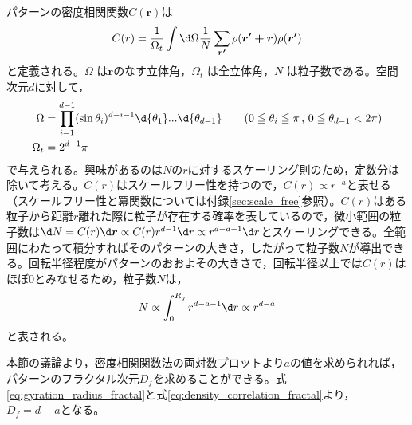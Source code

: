 \documentclass[autodetect-engine,dvi=dvipdfmx,a4paper,ja=standard,oneside,openany,11pt]{bxjsbook}
\begin{document}
パターンの密度相関関数$C(\bm{r})$は
\begin{equation}
  C(r)=\frac{1}{\Omega_t}\int \d\Omega \frac{1}{N}\sum_{{\bm{r'}}}\rho(\bm{r'+ r})\rho({\bm{r'}})
  \label{eq:density_correlation}
\end{equation}
と定義される。$\Omega$ は$\bm{r}$のなす立体角，$\Omega_t$ は全立体角，$N$ は粒子数である。空間次元$d$に対して，
\begin{equation}
  \begin{aligned}
    \Omega   & =\prod^{d-1}_{i=1} (\sin\theta_i)^{d-i-1} \d{\theta_1}...\d{\theta_{d-1}} \qquad(0\leqq \theta_i\leqq \pi\,,\,0\leqq\theta_{d-1}<2\pi) \\
    \Omega_t & =2^{d-1}\pi
  \end{aligned}
  \label{eq:omega}
\end{equation}
で与えられる。興味があるのは$N$の$r$に対するスケーリング則のため，定数分は除いて考える。$C(r)$はスケールフリー性を持つので，$C(r)\propto r^{-a}$と表せる（スケールフリー性と冪関数については付録\ref{sec:scale_free}参照）。$C(r)$はある粒子から距離$r$離れた際に粒子が存在する確率を表しているので，微小範囲の粒子数は$\d N=C(r)\d \bm{r}\propto C(r)r^{d-1}\d r\propto r^{d-a-1} \d r $とスケーリングできる。全範囲にわたって積分すればそのパターンの大きさ，したがって粒子数$N$が導出できる。回転半径程度がパターンのおおよその大きさで，回転半径以上では$C(r)$はほぼ0とみなせるため，粒子数$N$は，
\begin{equation}
  N\propto \int_{0}^{R_g} r^{d-a-1} \d r\propto r^{d-a}
  \label{eq:density_correlation_fractal}
\end{equation}
と表される。

本節の議論より，密度相関関数法の両対数プロットより$a$の値を求められれば，パターンのフラクタル次元$D_f$を求めることができる。式\ref{eq:gyration_radius_fractal}と式\ref{eq:density_correlation_fractal}より，$D_f=d-a$となる。


\ifdraft{
  
  
}{}
\end{document}
